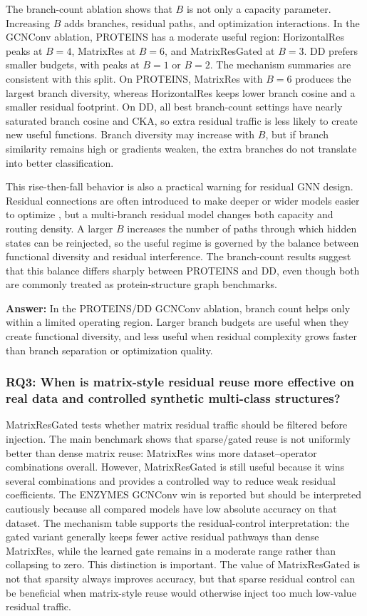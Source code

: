 The branch-count ablation shows that \(B\) is not only a capacity parameter. Increasing \(B\) adds branches, residual paths, and optimization interactions. In the GCNConv ablation, PROTEINS has a moderate useful region: HorizontalRes peaks at \(B=4\), MatrixRes at \(B=6\), and MatrixResGated at \(B=3\). DD prefers smaller budgets, with peaks at \(B=1\) or \(B=2\). The mechanism summaries are consistent with this split. On PROTEINS, MatrixRes with \(B=6\) produces the largest branch diversity, whereas HorizontalRes keeps lower branch cosine and a smaller residual footprint. On DD, all best branch-count settings have nearly saturated branch cosine and CKA, so extra residual traffic is less likely to create new useful functions. Branch diversity may increase with \(B\), but if branch similarity remains high or gradients weaken, the extra branches do not translate into better classification.

This rise-then-fall behavior is also a practical warning for residual GNN design. Residual connections are often introduced to make deeper or wider models easier to optimize \cite{he2016deep,li2019deepgcns,li2021training}, but a multi-branch residual model changes both capacity and routing density. A larger \(B\) increases the number of paths through which hidden states can be reinjected, so the useful regime is governed by the balance between functional diversity and residual interference. The branch-count results suggest that this balance differs sharply between PROTEINS and DD, even though both are commonly treated as protein-structure graph benchmarks.

\textbf{Answer:} In the PROTEINS/DD GCNConv ablation, branch count helps only within a limited operating region. Larger branch budgets are useful when they create functional diversity, and less useful when residual complexity grows faster than branch separation or optimization quality.

\subsubsection{RQ3: When is matrix-style residual reuse more effective on real data and controlled synthetic multi-class structures?}

MatrixResGated tests whether matrix residual traffic should be filtered before injection. The main benchmark shows that sparse/gated reuse is not uniformly better than dense matrix reuse: MatrixRes wins more dataset--operator combinations overall. However, MatrixResGated is still useful because it wins several combinations and provides a controlled way to reduce weak residual coefficients. The ENZYMES GCNConv win is reported but should be interpreted cautiously because all compared models have low absolute accuracy on that dataset. The mechanism table supports the residual-control interpretation: the gated variant generally keeps fewer active residual pathways than dense MatrixRes, while the learned gate remains in a moderate range rather than collapsing to zero. This distinction is important. The value of MatrixResGated is not that sparsity always improves accuracy, but that sparse residual control can be beneficial when matrix-style reuse would otherwise inject too much low-value residual traffic.

